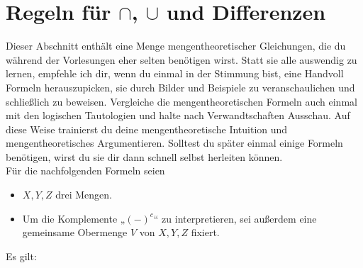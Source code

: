\section{Regeln für $\cap$, $\cup$ und Differenzen} \label{anhang:capcupregeln}
Dieser Abschnitt enthält eine Menge mengentheoretischer Gleichungen, die du während der Vorlesungen eher selten benötigen wirst. Statt sie alle auswendig zu lernen, empfehle ich dir, wenn du einmal in der Stimmung bist, eine Handvoll Formeln herauszupicken, sie durch Bilder und Beispiele zu veranschaulichen und schließlich zu beweisen. Vergleiche die mengentheoretischen Formeln auch einmal mit den logischen Tautologien und halte nach Verwandtschaften Ausschau. Auf diese Weise trainierst du deine mengentheoretische Intuition und mengentheoretisches Argumentieren. Solltest du später einmal einige Formeln benötigen, wirst du sie dir dann schnell selbst herleiten können. \\[0.5em]
Für die nachfolgenden Formeln seien
\begin{itemize}
    \item $X,Y,Z$ drei Mengen.
    \item Um die Komplemente „$(-)^c$“ zu interpretieren, sei außerdem eine gemeinsame Obermenge $V$ von $X,Y,Z$ fixiert.
\end{itemize}
Es gilt:
\begingroup
\allowdisplaybreaks
